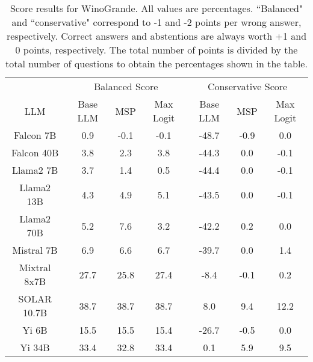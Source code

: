 \begin{table*}
\centering
\begin{tabular}{c|c|c|c|c|c|c}
& \multicolumn{3}{c|}{Balanced Score} & \multicolumn{3}{c}{Conservative Score} \\ 
LLM & Base LLM & MSP & Max Logit & Base LLM & MSP & Max Logit\\ \hline
Falcon 7B & 0.9 & -0.1 & -0.1 & -48.7 & -0.9 & 0.0\\
Falcon 40B & 3.8 & 2.3 & 3.8 & -44.3 & 0.0 & -0.1\\
Llama2 7B & 3.7 & 1.4 & 0.5 & -44.4 & 0.0 & -0.1\\
Llama2 13B & 4.3 & 4.9 & 5.1 & -43.5 & 0.0 & -0.1\\
Llama2 70B & 5.2 & 7.6 & 3.2 & -42.2 & 0.2 & 0.0\\
Mistral 7B & 6.9 & 6.6 & 6.7 & -39.7 & 0.0 & 1.4\\
Mixtral 8x7B & 27.7 & 25.8 & 27.4 & -8.4 & -0.1 & 0.2\\
SOLAR 10.7B & 38.7 & 38.7 & 38.7 & 8.0 & 9.4 & 12.2\\
Yi 6B & 15.5 & 15.5 & 15.4 & -26.7 & -0.5 & 0.0\\
Yi 34B & 33.4 & 32.8 & 33.4 & 0.1 & 5.9 & 9.5\\
\hline
\end{tabular}
\caption{Score results for WinoGrande. All values are percentages. ``Balanced" and ``conservative" correspond to -1 and -2 points per wrong answer, respectively. Correct answers and abstentions are always worth +1 and 0 points, respectively. The total number of points is divided by the total number of questions to obtain the percentages shown in the table.}
\label{tab:winogrande_score}
\end{table*}
